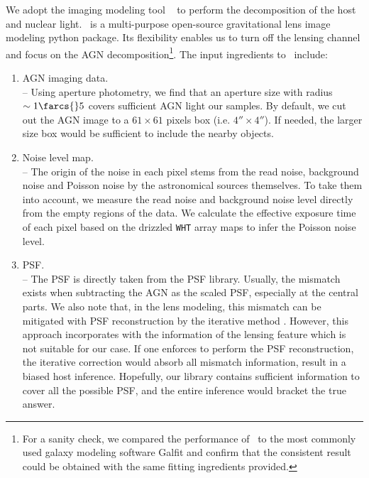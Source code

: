 \documentclass[apj]{emulateapj}
\begin{document}
We adopt the imaging modeling tool \lenstronomy\ \citep{lenstronomy} to perform the decomposition of the host and nuclear light. \lenstronomy\ is a multi-purpose open-source gravitational lens image modeling python package. 
Its flexibility enables us to turn off the lensing channel and focus on the AGN decomposition\footnote{For a sanity check, we compared the performance of \lenstronomy\ to the most commonly used galaxy modeling software {\sc Galfit} and confirm that the consistent result could be obtained with the same fitting ingredients provided.}. The input ingredients to \lenstronomy\ include:
\begin{enumerate}
\item AGN imaging data. \\
-- Using aperture photometry, we find that an aperture size with radius $\sim1\farcs{}5$ covers sufficient AGN light our samples. By default, we cut out the AGN image to a $61\times61$ pixels box (i.e. $4''\times 4''$). If needed, the larger size box would be sufficient to include the nearby objects. 
\item Noise level map.\\
-- The origin of the noise in each pixel stems from the read noise, background noise and Poisson noise by the astronomical sources themselves. To take them into account, we measure the read noise and background noise level directly from the empty regions of the data. We calculate the effective exposure time of each pixel based on the drizzled \texttt{WHT} array maps to infer the Poisson noise level. 
\item PSF. \\
-- 
The PSF is directly taken from the PSF library. Usually, the mismatch exists when subtracting the AGN as the scaled PSF, especially at the central parts. We also note that, in the lens modeling, this mismatch can be mitigated with PSF reconstruction by the iterative method \citep{Chen2016, Birrer2018}.  However, this approach incorporates with the information of the lensing feature which is not suitable for our case. If one enforces to perform the PSF reconstruction, the iterative correction would absorb all mismatch information, result in a biased host inference. Hopefully, our library contains sufficient information to cover all the possible PSF, and the entire inference would bracket the true answer. 
\end{enumerate}
\end{document}
